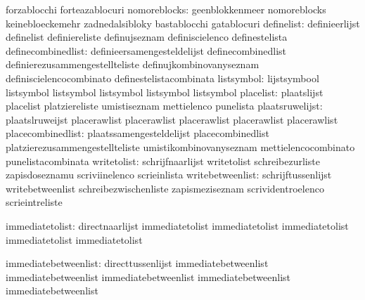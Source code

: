                                   forzablocchi                     forteazablocuri
                   nomoreblocks:  geenblokkenmeer                  nomoreblocks
                                  keinebloeckemehr                 zadnedalsibloky
                                  bastablocchi                     gatablocuri
                     definelist:  definieerlijst                   definelist
                                  definiereliste                   definujseznam
                                  definiscielenco                  definestelista
             definecombinedlist:  definieersamengesteldelijst      definecombinedlist
                                  definierezusammengestellteliste  definujkombinovanyseznam
                                  definiscielencocombinato         definestelistacombinata
listsymbol: lijstsymbool listsymbol
            listsymbol   listsymbol
            listsymbol   listsymbol
                      placelist:  plaatslijst                      placelist
                                  platziereliste                   umistiseznam
                                  mettielenco                      punelista
                plaatsruwelijst:  plaatslruweijst                  placerawlist
                                  placerawlist                     placerawlist
                                  placerawlist                     placerawlist
              placecombinedlist:  plaatssamengesteldelijst         placecombinedlist
                                  platzierezusammengestellteliste  umistikombinovanyseznam
                                  mettielencocombinato             punelistacombinata
                    writetolist:  schrijfnaarlijst                 writetolist
                                  schreibezurliste                 zapisdoseznamu
                                  scriviinelenco                   scrieinlista
               writebetweenlist:  schrijftussenlijst               writebetweenlist
                                  schreibezwischenliste            zapismeziseznam
                                  scrividentroelenco               scrieintreliste


                 immediatetolist: directnaarlijst                  immediatetolist
                                  immediatetolist                  immediatetolist
                                  immediatetolist                  immediatetolist

            immediatebetweenlist: directtussenlijst                immediatebetweenlist
                                  immediatebetweenlist             immediatebetweenlist
                                  immediatebetweenlist             immediatebetweenlist

